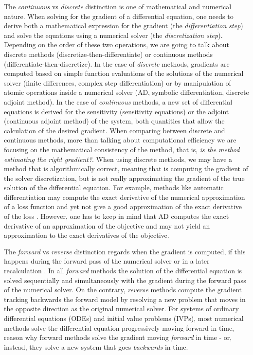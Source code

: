 The \textit{continuous} vs \textit{discrete} distinction is one of mathematical and numerical nature. 
When solving for the gradient of a differential equation, one needs to derive both a mathematical expression for the gradient (the \textit{differentiation step}) and solve the equations using a numerical solver (the \textit{discretization step})\cite{bradley2013pde, Onken_Ruthotto_2020, FATODE2014, Sirkes_Tziperman_1997}. 
Depending on the order of these two operations, we are going to talk about discrete methods (discretize-then-differentiate) or continuous methods (differentiate-then-discretize). 
In the case of \textit{discrete} methods, gradients are computed based on simple function evaluations of the solutions of the numerical solver (finite differences, complex step differentiation) or by manipulation of atomic operations inside a numerical solver (AD, symbolic differentiation, discrete adjoint method). 
In the case of \textit{continuous} methods, a new set of differential equations is derived for the sensitivity (sensitivity equations) or the adjoint (continuous adjoint method) of the system, both quantities that allow the calculation of the desired gradient.   
When comparing between discrete and continuous methods, more than talking about computational efficiency we are focusing on the mathematical consistency of the method, that is, \textit{is the method estimating the right gradient?}. 
When using discrete methods, we may have a method that is algorithmically correct, meaning that is computing the gradient of the solver discretization, but is not really approximating the gradient of the true solution of the differential equation. 
For example, methods like automatic differentiation may compute the exact derivative of the numerical approximation of a loss function and yet not give a good approximation of the exact derivative of the loss \cite{Walther_2007}.
However, one has to keep in mind that AD computes the exact derivative of an approximation of the objective and may not yield an approximation to the exact derivatives of the objective.

The \textit{forward} vs \textit{reverse} distinction regards when the gradient is computed, if this happens during the forward pass of the numerical solver or in a later recalculation \cite{Griewank:2008kh}. 
In all \textit{forward} methods the solution of the differential equation is solved sequentially and simultaneously with the gradient during the forward pass of the numerical solver.  
On the contrary, \textit{reverse} methods compute the gradient tracking backwards the forward model by resolving a new problem that moves in the opposite direction as the original numerical solver. 
For systems of ordinary differential equations (ODEs) and initial value problems (IVPs), most numerical methods solve the differential equation progressively moving forward in time, reason why forward methods solve the gradient moving \textit{forward} in time - or, instead, they solve a new system that goes \textit{backwards} in time.

